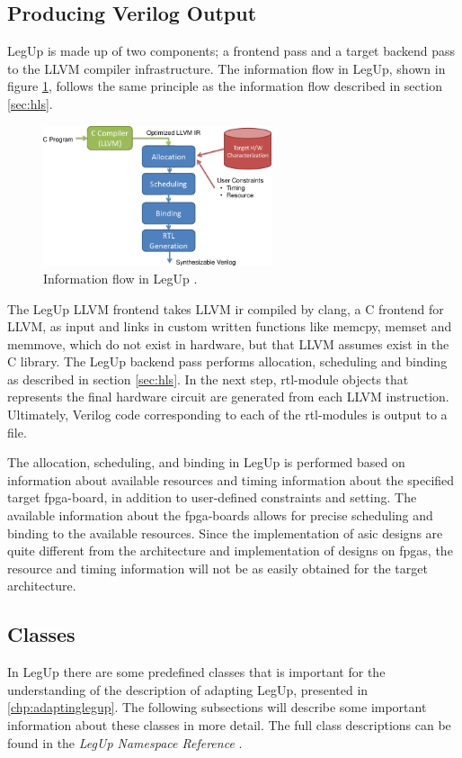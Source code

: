 \subsection{Producing Verilog Output}
LegUp is made up of two components; a frontend pass and a target backend pass to the LLVM compiler infrastructure. 
The information flow in LegUp, shown in figure \ref{fig:legupflow}, follows the same principle as the information flow described in section \ref{sec:hls}.
\begin{figure}[hbpt]
\centering
\includegraphics[width=0.6\textwidth]{../figs/LegUpFlow.png}
\caption{\label{fig:legupflow}Information flow in LegUp \cite{legupmaual}.}
\end{figure}
The LegUp LLVM frontend takes LLVM \gls{ir} compiled by clang, a C frontend for LLVM, as input and links in custom written functions like memcpy, memset and memmove, which do not exist in hardware, but that LLVM assumes exist in the C library. 
The LegUp backend pass performs allocation, scheduling and binding as described in section \ref{sec:hls}. In the next step, \gls{rtl}-module objects that represents the final hardware circuit are generated from each LLVM instruction. Ultimately, Verilog code corresponding to each of the \gls{rtl}-modules is output to a file.

The allocation, scheduling, and binding in LegUp is performed based on information about available resources and timing information about the specified target \gls{fpga}-board, in addition to user-defined constraints and setting. The available information about the \gls{fpga}-boards allows for precise scheduling and binding to the available resources. Since the implementation of \gls{asic} designs are quite different from the architecture and implementation of designs on \gls{fpga}s, the resource and timing information will not be as easily obtained for the target architecture. 

\subsection{\label{sec:legupclasses}Classes}
In LegUp there are some predefined classes that is important for the understanding of the description of adapting LegUp, presented in \cref{chp:adaptinglegup}. The following subsections will describe some important information about these classes in more detail. The full class descriptions can be found in the \textit{LegUp Namespace Reference} \cite{legupclassref}.
